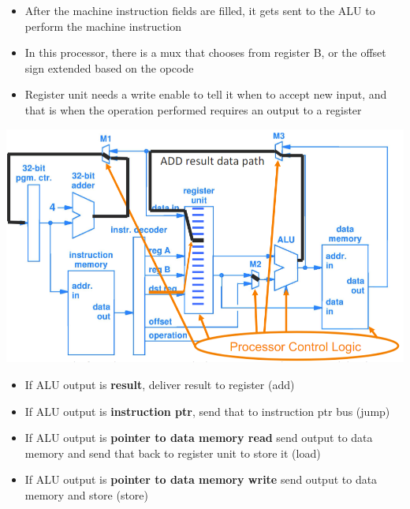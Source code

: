 \documentclass{article}
\begin{document}
 \begin{itemize}
     \item After the machine instruction fields are filled, it gets sent to the ALU to perform the machine instruction
     
     \item In this processor, there is a mux that chooses from register B, or the offset sign extended based on the opcode
     
     \item Register unit needs a write enable to tell it when to accept new input, and that is when the operation performed requires an output to a register 
     
 \end{itemize}
 
 \includegraphics[scale=0.35]{images/6.9 pt 4.png}
 
 \begin{itemize}
      \item If ALU output is \textbf{result},  deliver result to register (add)
    
    \item If ALU output is \textbf{instruction ptr}, send that to instruction ptr bus (jump)
    
    \item If ALU output is \textbf{pointer to data memory read} send output to data memory and send that back to register unit to store it (load)
    
    \item If ALU output is \textbf{pointer to data memory write} send output to data memory and store (store)
 \end{itemize}
 
\end{document}

